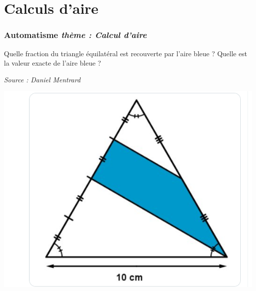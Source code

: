 \documentclass[11pt]{beamer}
\newcounter{autocompteur}
\newcommand{\automatisme}[1]{\addtocounter{autocompteur}{1}\frametitle{Automatisme  \theautocompteur  \textit{ thème : #1}}}
\begin{document}
\section{Calculs d'aire}

\begin{frame}
\automatisme{Calcul d'aire}
Quelle fraction du triangle équilatéral est recouverte par l'aire bleue ?
Quelle est la valeur exacte de l'aire bleue ?

{\small \textit{Source : Daniel Mentrard}}

\begin{center}
\includegraphics[scale=0.25]{ressources/15-02-2023.png}
\end{center}

\end{frame}
\end{document}
